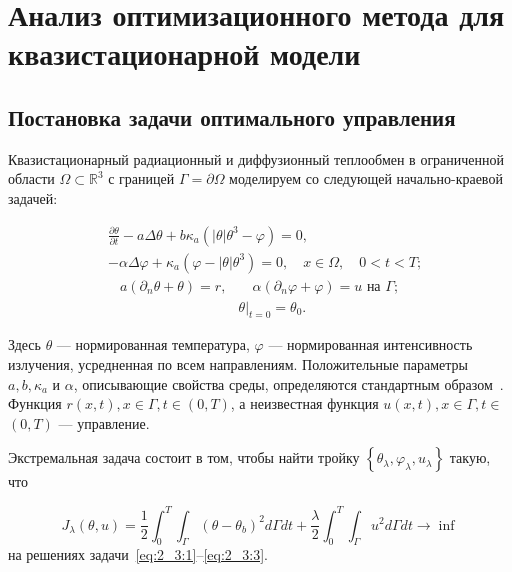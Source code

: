 \section{Анализ оптимизационного метода для квазистационарной модели}
\label{sec:ch2/sec3}

\subsection{Постановка задачи оптимального управления}
\label{subsec:ch2/sec3/state}
Квазистационарный радиационный и диффузионный теплообмен в ограниченной области
$\Omega \subset \mathbb{R}^{3}$ с границей $\Gamma=\partial \Omega$ моделируем
со следующей начально-краевой задачей:

\begin{equation}
    \label{eq:2_3:1}
    \begin{split}
        & \frac{\partial \theta}{\partial t} - a \Delta \theta
        + b \kappa_{a} \left(|\theta| \theta^{3}-\varphi\right) = 0,\\
        & - \alpha \Delta \varphi
        + \kappa_{a} \left(\varphi-|\theta| \theta^{3}\right) = 0,
        \quad x \in \Omega, \quad 0 < t < T;
    \end{split}
\end{equation}
\begin{align}
    a \left(\partial_{n} \theta+\theta\right)=r,
    & \quad \alpha\left(\partial_{n} \varphi
    + \varphi\right) = u \text { на } \Gamma;  \label{eq:2_3:2}\\
    & \left.\theta\right|_{t=0} = \theta_{0}. \label{eq:2_3:3}
\end{align}

Здесь $\theta$ — нормированная температура,
$\varphi$ — нормированная интенсивность излучения,
усредненная по всем направлениям.
Положительные параметры $a, b, \kappa_{a}$ и $\alpha$,
описывающие свойства среды,
определяются стандартным образом~\cite{Kovtanyuk2015}.
Функция $r(x, t), x \in \Gamma, t \in(0, T)$,
а неизвестная функция $u(x, t), x \in \Gamma, t \in$ $(0, T)$ — управление.


Экстремальная задача состоит в том, чтобы найти тройку
$\left\{\theta_{\lambda}, \varphi_{\lambda}, u_{\lambda}\right\}$ такую, что

\begin{equation}
    \label{eq:2_3:4}
    J_{\lambda}(\theta, u)=\frac{1}{2} \int_{0}^{T}
    \int_{\Gamma}\left(\theta-\theta_{b}\right)^{2} d \Gamma d t+\frac{\lambda}{2}
    \int_{0}^{T} \int_{\Gamma} u^{2} d \Gamma d t \rightarrow \inf
\end{equation}
на решениях задачи~\eqref{eq:2_3:1}--\eqref{eq:2_3:3}.

